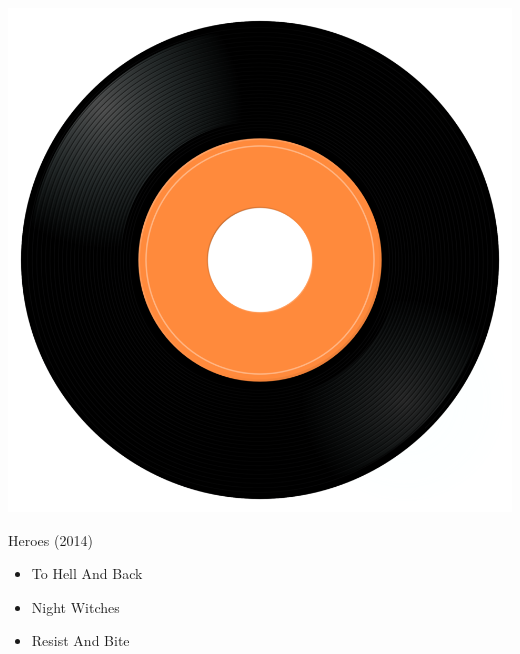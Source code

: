 \begin{minipage}[t]{0.25\textwidth}
\captionsetup{type=figure}
\includegraphics[width=\textwidth]{Images/cover.png}
\caption*{Heroes (2014)}
\end{minipage}
\begin{minipage}[t]{0.25\textwidth}\vspace{0pt}
\begin{itemize}[nosep,leftmargin=1em,labelwidth=*,align=left]
	\setlength{\itemsep}{0pt}
	\item To Hell And Back
	\item Night Witches
	\item Resist And Bite
\end{itemize}
\end{minipage}
